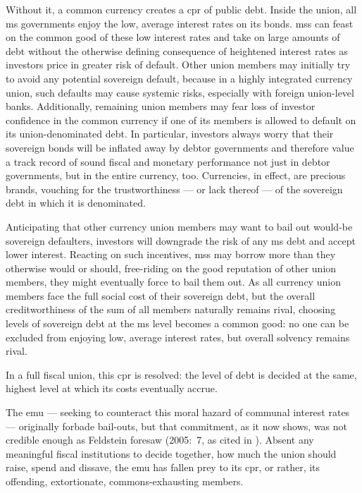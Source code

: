 Without it, a common currency creates a \gls{cpr} of public debt.
Inside the union, all \gls{ms} governments enjoy the low, average interest rates on its bonds.
\glspl{ms} can feast on the common good of these low interest rates and take on large amounts of debt without the otherwise defining consequence of heightened interest rates as investors price in greater risk of default.
Other union members may initially try to avoid any potential sovereign default, because in a highly integrated currency union, such defaults may cause systemic risks, especially with foreign union-level banks.
Additionally, remaining union members may fear loss of investor confidence in the common currency if one of its members is allowed to default on its union-denominated debt.
In particular, investors always worry that their sovereign bonds will be inflated away by debtor governments and therefore value a track record of sound fiscal and monetary performance not just in debtor governments, but in the entire currency, too.
Currencies, in effect, are precious brands, vouching for the trustworthiness --- or lack thereof --- of the sovereign debt in which it is denominated.

Anticipating that other currency union members may want to bail out would-be sovereign defaulters, investors will downgrade the risk of any \gls{ms} debt and accept lower interest.
Reacting on such incentives, \glspl{ms} may borrow more than they otherwise would or should, free-riding on the good reputation of other union members, they might eventually force to bail them out.
As all currency union members face the full social cost of their sovereign debt, but the overall creditworthiness of the sum of all members naturally remains rival, choosing levels of sovereign debt at the \gls{ms} level becomes a common good:
no one can be excluded from enjoying low, average interest rates, but overall solvency remains rival.

In a full fiscal union, this \gls{cpr} is resolved:
the level of debt is decided at the same, highest level at which its costs eventually accrue.

The \gls{emu} --- seeking to counteract this moral hazard of communal interest rates --- originally forbade bail-outs, but that commitment, as it now shows, was not credible enough as Feldstein foresaw (2005:~7, as cited in \citealt[13]{Begg2008}).
Absent any meaningful fiscal institutions to decide together, how much the union should raise, spend and dissave, the \gls{emu} has fallen prey to its \gls{cpr}, or rather, its offending, extortionate, commons-exhausting members.

